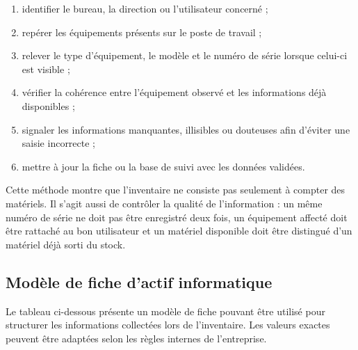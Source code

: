 \documentclass[12pt,a4paper]{report}
\begin{document}
\begin{enumerate}[label=\arabic*.]
    \item identifier le bureau, la direction ou l'utilisateur concerné ;
    \item repérer les équipements présents sur le poste de travail ;
    \item relever le type d'équipement, le modèle et le numéro de série lorsque celui-ci est visible ;
    \item vérifier la cohérence entre l'équipement observé et les informations déjà disponibles ;
    \item signaler les informations manquantes, illisibles ou douteuses afin d'éviter une saisie incorrecte ;
    \item mettre à jour la fiche ou la base de suivi avec les données validées.
\end{enumerate}

Cette méthode montre que l'inventaire ne consiste pas seulement à compter des matériels. Il s'agit aussi de contrôler la qualité de l'information : un même numéro de série ne doit pas être enregistré deux fois, un équipement affecté doit être rattaché au bon utilisateur et un matériel disponible doit être distingué d'un matériel déjà sorti du stock.

\subsection{Modèle de fiche d'actif informatique}

Le tableau ci-dessous présente un modèle de fiche pouvant être utilisé pour structurer les informations collectées lors de l'inventaire. Les valeurs exactes peuvent être adaptées selon les règles internes de l'entreprise.
\end{document}
